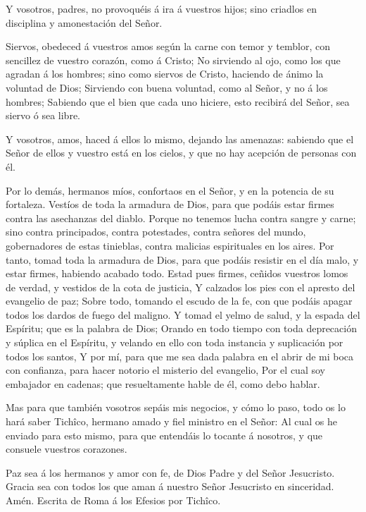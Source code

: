  Y vosotros, padres, no provoquéis á ira á vuestros hijos;
sino criadlos en disciplina y amonestación del Señor.

 Siervos, obedeced á vuestros amos según la carne con temor
y temblor, con sencillez de vuestro corazón, como á Cristo; 
No sirviendo al ojo, como los que agradan á los hombres; sino como
siervos de Cristo, haciendo de ánimo la voluntad de Dios; 
Sirviendo con buena voluntad, como al Señor, y no á los hombres;
 Sabiendo que el bien que cada uno hiciere, esto recibirá
del Señor, sea siervo ó sea libre.

 Y vosotros, amos, haced á ellos lo mismo, dejando las
amenazas: sabiendo que el Señor de ellos y vuestro está en los cielos, y
que no hay acepción de personas con él.

 Por lo demás, hermanos míos, confortaos en el Señor, y en
la potencia de su fortaleza.  Vestíos de toda la armadura
de Dios, para que podáis estar firmes contra las asechanzas del diablo.
 Porque no tenemos lucha contra sangre y carne; sino contra
principados, contra potestades, contra señores del mundo, gobernadores
de estas tinieblas, contra malicias espirituales en los aires.
 Por tanto, tomad toda la armadura de Dios, para que podáis
resistir en el día malo, y estar firmes, habiendo acabado todo.
 Estad pues firmes, ceñidos vuestros lomos de verdad, y
vestidos de la cota de justicia,  Y calzados los pies con
el apresto del evangelio de paz;  Sobre todo, tomando el
escudo de la fe, con que podáis apagar todos los dardos de fuego del
maligno.  Y tomad el yelmo de salud, y la espada del
Espíritu; que es la palabra de Dios;  Orando en todo tiempo
con toda deprecación y súplica en el Espíritu, y velando en ello con
toda instancia y suplicación por todos los santos,  Y por
mí, para que me sea dada palabra en el abrir de mi boca con confianza,
para hacer notorio el misterio del evangelio,  Por el cual
soy embajador en cadenas; que resueltamente hable de él, como debo
hablar.

 Mas para que también vosotros sepáis mis negocios, y cómo
lo paso, todo os lo hará saber Tichîco, hermano amado y fiel ministro en
el Señor:  Al cual os he enviado para esto mismo, para que
entendáis lo tocante á nosotros, y que consuele vuestros corazones.

 Paz sea á los hermanos y amor con fe, de Dios Padre y del
Señor Jesucristo.  Gracia sea con todos los que aman á
nuestro Señor Jesucristo en sinceridad. Amén. Escrita de Roma á los
Efesios por Tichîco.
